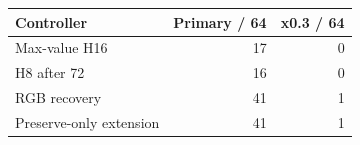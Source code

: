 \begin{tabular}{lrr}
\toprule
Controller & Primary / 64 & x0.3 / 64 \\
\midrule
Max-value H16 & 17 & 0 \\
H8 after 72 & 16 & 0 \\
RGB recovery & 41 & 1 \\
Preserve-only extension & 41 & 1 \\
\bottomrule
\end{tabular}
